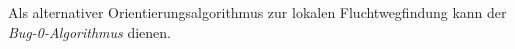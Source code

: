 Als alternativer Orientierungsalgorithmus zur lokalen Fluchtwegfindung kann der \emph{Bug-0-Algorithmus} dienen.
